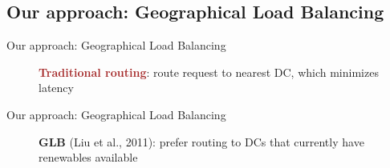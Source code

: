 \documentclass[xcolor=dvipsnames]{beamer}
\begin{document}
\subsection{Our approach: Geographical Load Balancing}
\begin{frame}{Our approach: Geographical Load Balancing}
	\begin{figure}
		\caption{\textbf{\textcolor{brown}{Traditional routing}}: route request to nearest DC, which minimizes latency}
		\centering
	\end{figure}
\end{frame}
\begin{frame}{Our approach: Geographical Load Balancing}
	\begin{figure}
		\caption{\textbf{\textcolor{dgreen}{GLB}} (Liu et al., 2011): prefer routing to DCs that currently have renewables available}
		\centering
	\end{figure}
\end{frame}
\end{document}
